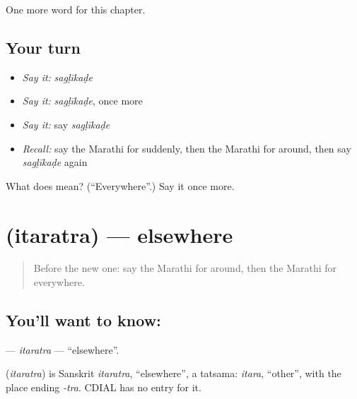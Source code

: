 \begin{grammarlens}[title={What you've built}]
One more word for this chapter.
\end{grammarlens}

\subsection*{Your turn}
\begin{itemize}
\raggedright
  \item \emph{Say it:} \emph{sagḷīkaḍe}
  \item \emph{Say it:} \emph{sagḷīkaḍe}, once more
  \item \emph{Say it:} say \emph{sagḷīkaḍe}
  \item \emph{Recall:} say the Marathi for suddenly, then the Marathi for around, then say \emph{sagḷīkaḍe} again
\end{itemize}

\begin{tcolorbox}[breakable,colback=teal!4,colframe=teal!35!black,title={Before you move on}]
What does  mean? (\textquotedblleft{}Everywhere\textquotedblright{}.) Say it once more.
\end{tcolorbox}
\section[\texorpdfstring{\mr{इतरत्र} (itaratra)}{इतरत्र (itaratra)}]{ (itaratra) — elsewhere}

\label{lesson:MR-C172-itaratra}



\begin{quote}
Before the new one: say the Marathi for around, then the Marathi for everywhere.
\end{quote}

\subsection*{You'll want to know: }
\textbf{} — \emph{itaratra} — \textquotedblleft{}elsewhere\textquotedblright{}.

\begin{cousinweb}
\textbf{} (\emph{itaratra}) is Sanskrit \emph{itaratra}, \textquotedblleft{}elsewhere\textquotedblright{}, a tatsama: \emph{itara}, \textquotedblleft{}other\textquotedblright{}, with the place ending \emph{-tra}. CDIAL has no entry for it.
\end{cousinweb}

